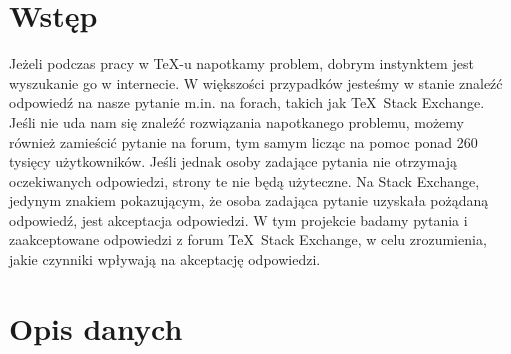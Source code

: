 \documentclass[12pt]{article}
\begin{document}
    \maketitle
    \tableofcontents
    \newpage

    \section{Wstęp}\label{sec:wstep}
  
Jeżeli podczas pracy w \TeX-u napotkamy problem, dobrym instynktem jest wyszukanie go w internecie. W większości przypadków jesteśmy w stanie znaleźć odpowiedź na nasze pytanie m.in. na forach, takich jak \TeX~Stack Exchange. Jeśli nie uda nam się znaleźć rozwiązania napotkanego problemu, możemy również zamieścić pytanie na forum, tym samym licząc na pomoc ponad 260 tysięcy użytkowników. Jeśli jednak osoby zadające pytania nie otrzymają oczekiwanych odpowiedzi, strony te nie będą użyteczne. Na Stack Exchange, jedynym znakiem pokazującym, że osoba zadająca pytanie uzyskała pożądaną odpowiedź, jest akceptacja odpowiedzi. W tym projekcie badamy pytania i zaakceptowane odpowiedzi z forum \TeX~Stack Exchange, w celu zrozumienia, jakie czynniki wpływają na akceptację odpowiedzi.

	\section{Opis danych}\label{sec:opis-danych}
\end{document}
